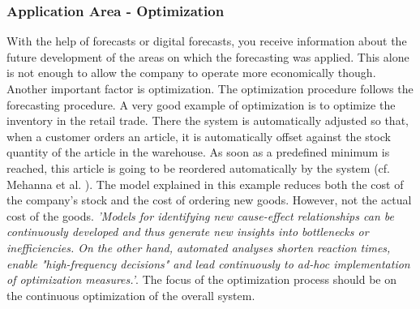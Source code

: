 \documentclass[12pt,twocolumn,twoside]{conference}   %
\begin{document}
\subsubsection{Application Area - Optimization}
With the help of forecasts or digital forecasts, you receive information about the future development of the areas on which the forecasting was applied. This alone is not enough to allow the company to operate more economically though. Another important factor is optimization. The optimization procedure follows the forecasting procedure. A very good example of optimization is to optimize the inventory in the retail trade. There the system is automatically adjusted so that, when a customer orders an article, it is automatically offset against the stock quantity of the article in the warehouse. As soon as a predefined minimum is reached, this article is going to be reordered automatically by the system (cf. Mehanna et al. \cite{2}). The model explained in this example reduces both the cost of the company's stock and the cost of ordering new goods. However, not the actual cost of the goods. \textit{'Models for identifying new cause-effect relationships can be continuously developed and thus generate new insights into bottlenecks or inefficiencies. On the other hand, automated analyses shorten reaction times, enable "high-frequency decisions" and lead continuously to ad-hoc implementation of optimization measures.'}\cite{2}. The focus of the optimization process should be on the continuous optimization of the overall system.
\end{document}
